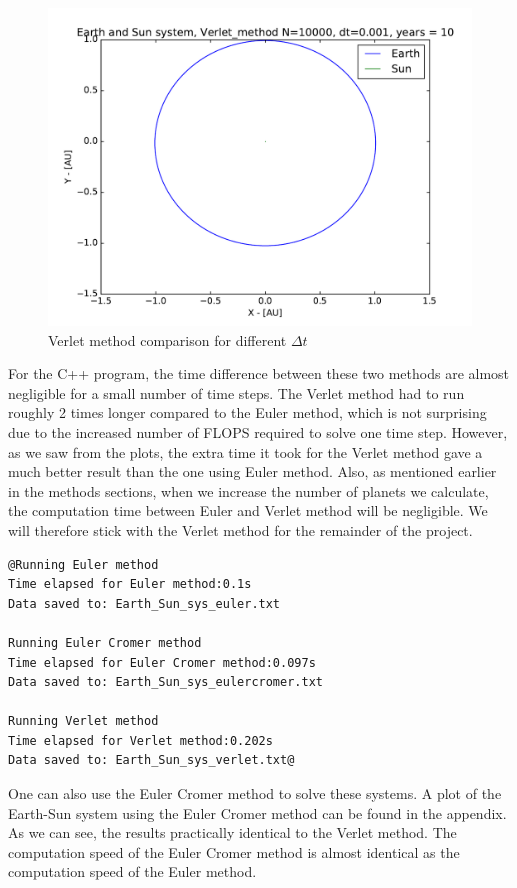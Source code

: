 \documentclass[12pt]{article}
\begin{document}
\begin{figure}[!h]
\centering
\includegraphics[width=\linewidth]{Plots/Earth_Sun_Verlet_method_larger_dt.pdf}
\caption{Verlet method comparison for different $\Delta t$}
\label{fig:balle3}
\end{figure}

For the C++ program, the time difference between these two methods are almost negligible for a small number of time steps. The Verlet method had to run roughly 2 times longer compared to the Euler method, which is not surprising due to the increased number of FLOPS required to solve one time step. However, as we saw from the plots, the extra time it took for the Verlet method gave a much better result than the one using Euler method. Also, as mentioned earlier in the methods sections, when we increase the number of planets we calculate, the computation time between Euler and Verlet method will be negligible. We will therefore stick with the Verlet method for the remainder of the project. 

\begin{lstlisting}
@Running Euler method
Time elapsed for Euler method:0.1s
Data saved to: Earth_Sun_sys_euler.txt

Running Euler Cromer method
Time elapsed for Euler Cromer method:0.097s
Data saved to: Earth_Sun_sys_eulercromer.txt

Running Verlet method
Time elapsed for Verlet method:0.202s
Data saved to: Earth_Sun_sys_verlet.txt@
\end{lstlisting}

One can also use the Euler Cromer method to solve these systems. A plot of the Earth-Sun system using the Euler Cromer method can be found in the appendix. As we can see, the results practically identical to the Verlet method. The computation speed of the Euler Cromer method is almost identical as the computation speed of the Euler method.
\FloatBarrier
\end{document}

